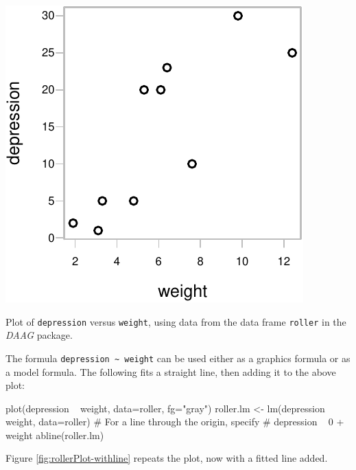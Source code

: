\documentclass{tufte-book}\usepackage[]{graphicx}\usepackage[]{color}
\newcommand{\txtt}[1]{\texttt{#1}}
\begin{document}
\begin{marginfigure}
\begin{Schunk}


\centerline{\includegraphics[width=\textwidth]{figs/8-plt-roller-1} }

\end{Schunk}
  \caption{Plot of \txtt{depression} versus \txtt{weight}, using data
from the data frame \txtt{roller} in the {\em DAAG}
package.}\label{fig:rollerPlot}
\end{marginfigure}

The formula \verb!depression ~ weight! can be used either as a
graphics formula or as a model formula. The following
fits a straight line, then adding it to the above plot:
\begin{Schunk}
\begin{Sinput}
plot(depression ~ weight, data=roller, fg="gray")
roller.lm <- lm(depression ~ weight, data=roller)
# For a line through the origin, specify
# depression ~ 0 + weight
abline(roller.lm)
\end{Sinput}
\end{Schunk}
Figure \ref{fig:rollerPlot-withline} repeats the plot, now with a
fitted line added.
\end{document}
